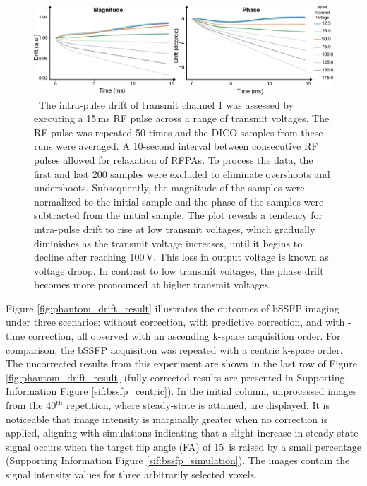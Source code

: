\begin{figure}
    \centering
    \includegraphics[width=\textwidth]{figures/droop.pdf}
    \caption{\ The intra-pulse drift of transmit channel 1 was assessed by executing a 15\,ms RF pulse across a range of transmit voltages. The RF pulse was repeated 50 times and the DICO samples from these runs were averaged. A 10-second interval between consecutive RF pulses allowed for relaxation of RFPAs. To process the data, the first and last 200 samples were excluded to eliminate overshoots and undershoots. Subsequently, the magnitude of the samples were normalized to the initial sample and the phase of the samples were subtracted from the initial sample. The plot reveals a tendency for intra-pulse drift to rise at low transmit voltages, which gradually diminishes as the transmit voltage increases, until it begins to decline after reaching 100\,V. This loss in output voltage is known as voltage droop. In contrast to low transmit voltages, the phase drift becomes more pronounced at higher transmit voltages.}
    \label{fig:droop}
\end{figure}

Figure \ref{fig:phantom_drift_result} illustrates the outcomes of bSSFP imaging under three scenarios: without correction, with predictive correction, and with -time correction, all observed with an ascending k-space acquisition order. For comparison, the bSSFP acquisition was repeated with a centric k-space order. The uncorrected results from this experiment are shown in the last row of Figure \ref{fig:phantom_drift_result} (fully corrected results are presented in Supporting Information Figure \ref{sif:bssfp_centric}). In the initial column, unprocessed images from the 40$^\text{th}$ repetition, where steady-state is attained, are displayed. It is noticeable that image intensity is marginally greater when no correction is applied, aligning with simulations indicating that a slight increase in steady-state signal occurs when the target flip angle (FA) of 15\textdegree\, is raised by a small percentage (Supporting Information Figure \ref{sif:bssfp_simulation}). The images contain the signal intensity values for three arbitrarily selected voxels.

